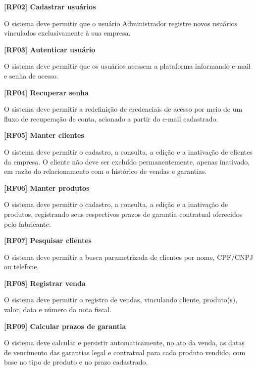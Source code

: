 \vspace{\baselineskip}
\noindent\textbf{[RF02] Cadastrar usuários}

O sistema deve permitir que o usuário Administrador registre novos usuários vinculados exclusivamente à sua empresa.

\vspace{\baselineskip}
\noindent\textbf{[RF03] Autenticar usuário}

O sistema deve permitir que os usuários acessem a plataforma informando e-mail e senha de acesso.

\vspace{\baselineskip}
\noindent\textbf{[RF04] Recuperar senha}

O sistema deve permitir a redefinição de credenciais de acesso por meio de um fluxo de recuperação de conta, acionado a partir do e-mail cadastrado.

\vspace{\baselineskip}
\noindent\textbf{[RF05] Manter clientes}

O sistema deve permitir o cadastro, a consulta, a edição e a inativação de clientes da empresa. O cliente não deve ser excluído permanentemente, apenas inativado, em razão do relacionamento com o histórico de vendas e garantias.

\vspace{\baselineskip}
\noindent\textbf{[RF06] Manter produtos}

O sistema deve permitir o cadastro, a consulta, a edição e a inativação de produtos, registrando seus respectivos prazos de garantia contratual oferecidos pelo fabricante.

\vspace{\baselineskip}
\noindent\textbf{[RF07] Pesquisar clientes}

O sistema deve permitir a busca parametrizada de clientes por nome, CPF/CNPJ ou telefone.

\vspace{\baselineskip}
\noindent\textbf{[RF08] Registrar venda}

O sistema deve permitir o registro de vendas, vinculando cliente, produto(s), valor, data e número da nota fiscal.

\vspace{\baselineskip}
\noindent\textbf{[RF09] Calcular prazos de garantia}

O sistema deve calcular e persistir automaticamente, no ato da venda, as datas de vencimento das garantias legal e contratual para cada produto vendido, com base no tipo de produto e no prazo cadastrado.

